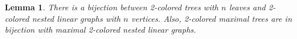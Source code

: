 \documentclass[twoside, 12pt]{amsart}
\newtheorem{lemma}[definition]{Lemma}
\theoremstyle{remark}
\begin{document}
\begin{lemma} 
\label{lemma:bijection}
There is a bijection between 2-colored trees with $n$ leaves and 2-colored nested linear graphs with $n$ vertices. Also, 2-colored maximal trees are in bijection with maximal 2-colored nested linear graphs.
\begin{figure}[h!]
\resizebox{0.8\linewidth}{!}{
















}
\end{figure}
\end{lemma}
\end{document}
